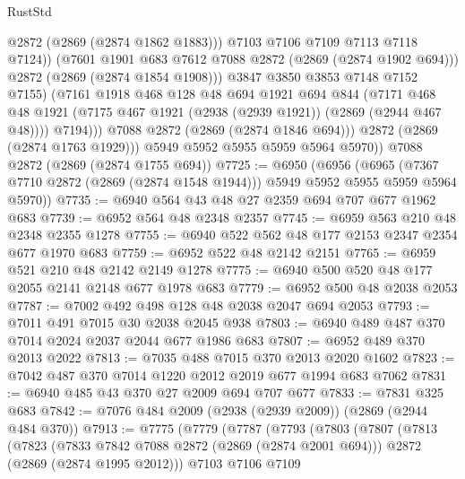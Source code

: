 \begin{lexlean}{RustStd}
\begin{coremodule}
                          @2872
                          (@2869 (@2874 @1862 @1883)))
                        @7103
                        @7106
                        @7109
                        @7113
                        @7118
                        @7124))
                    (@7601 @1901 @683 @7612 @7088 @2872 (@2869 (@2874 @1902 @694)))
                    @2872
                    (@2869 (@2874 @1854 @1908)))
                  @3847
                  @3850
                  @3853
                  @7148
                  @7152
                  @7155)
                (@7161
                  @1918
                  @468
                  @128
                  @48
                  @694
                  @1921
                  @694
                  @844
                  (@7171
                    @468
                    @48
                    @1921
                    (@7175 @467 @1921 (@2938 (@2939 @1921)) (@2869 (@2944 @467 @48))))
                  @7194)))
            @7088
            @2872
            (@2869 (@2874 @1846 @694)))
          @2872
          (@2869 (@2874 @1763 @1929)))
        @5949
        @5952
        @5955
        @5959
        @5964
        @5970))
    @7088
    @2872
    (@2869 (@2874 @1755 @694))
@7725 := @6950
    (@6956
      (@6965 (@7367 @7710 @2872 (@2869 (@2874 @1548 @1944))) @5949 @5952 @5955 @5959 @5964 @5970))
@7735 := @6940 @564 @43 @48 @27 @2359 @694 @707 @677 @1962 @683
@7739 := @6952 @564 @48 @2348 @2357
@7745 := @6959 @563 @210 @48 @2348 @2355 @1278
@7755 := @6940 @522 @562 @48 @177 @2153 @2347 @2354 @677 @1970 @683
@7759 := @6952 @522 @48 @2142 @2151
@7765 := @6959 @521 @210 @48 @2142 @2149 @1278
@7775 := @6940 @500 @520 @48 @177 @2055 @2141 @2148 @677 @1978 @683
@7779 := @6952 @500 @48 @2038 @2053
@7787 := @7002 @492 @498 @128 @48 @2038 @2047 @694 @2053
@7793 := @7011 @491 @7015 @30 @2038 @2045 @938
@7803 := @6940 @489 @487 @370 @7014 @2024 @2037 @2044 @677 @1986 @683
@7807 := @6952 @489 @370 @2013 @2022
@7813 := @7035 @488 @7015 @370 @2013 @2020 @1602
@7823 := @7042 @487 @370 @7014 @1220 @2012 @2019 @677 @1994 @683 @7062
@7831 := @6940 @485 @43 @370 @27 @2009 @694 @707 @677
@7833 := @7831 @325 @683
@7842 := @7076 @484 @2009 (@2938 (@2939 @2009)) (@2869 (@2944 @484 @370))
@7913 := @7775
    (@7779
      (@7787
        (@7793
          (@7803
            (@7807
              (@7813
                (@7823
                  (@7833 @7842 @7088 @2872 (@2869 (@2874 @2001 @694)))
                  @2872
                  (@2869 (@2874 @1995 @2012)))
                @7103
                @7106
                @7109

\end{coremodule}
\end{lexlean}
